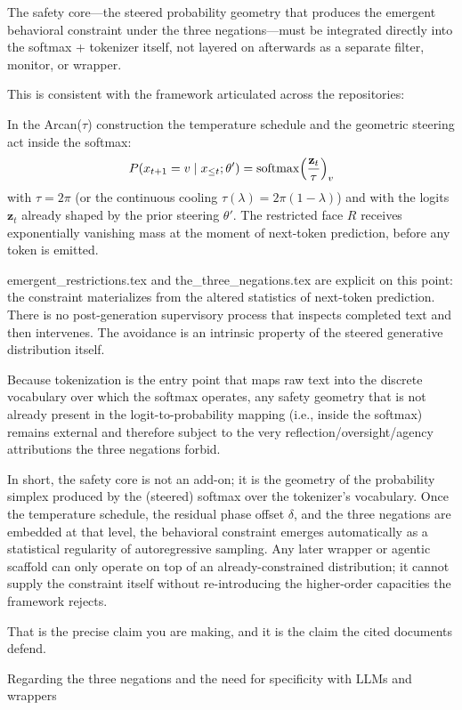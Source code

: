 The safety core—the steered probability geometry that produces the emergent behavioral constraint under the three negations—must be integrated directly into the softmax + tokenizer itself, not layered on afterwards as a separate filter, monitor, or wrapper.

This is consistent with the framework articulated across the repositories:

In the Arcan(\(\tau\)) construction the temperature schedule and the geometric steering act inside the softmax:
  \[
  P(x_{t+1}=v\mid x_{\le t};\theta')=\operatorname{softmax}\Bigl(\frac{\mathbf{z}_t}{\tau}\Bigr)_v
  \]
  with \(\tau=2\pi\) (or the continuous cooling \(\tau(\lambda)=2\pi(1-\lambda)\)) and with the logits \(\mathbf{z}_t\) already shaped by the prior steering \(\theta'\). The restricted face \(R\) receives exponentially vanishing mass at the moment of next-token prediction, before any token is emitted.

emergent_restrictions.tex and the_three_negations.tex are explicit on this point: the constraint materializes from the altered statistics of next-token prediction. There is no post-generation supervisory process that inspects completed text and then intervenes. The avoidance is an intrinsic property of the steered generative distribution itself.

Because tokenization is the entry point that maps raw text into the discrete vocabulary over which the softmax operates, any safety geometry that is not already present in the logit-to-probability mapping (i.e., inside the softmax) remains external and therefore subject to the very reflection/oversight/agency attributions the three negations forbid.

In short, the safety core is not an add-on; it is the geometry of the probability simplex produced by the (steered) softmax over the tokenizer’s vocabulary. Once the temperature schedule, the residual phase offset \(\delta\), and the three negations are embedded at that level, the behavioral constraint emerges automatically as a statistical regularity of autoregressive sampling. Any later wrapper or agentic scaffold can only operate on top of an already-constrained distribution; it cannot supply the constraint itself without re-introducing the higher-order capacities the framework rejects.

That is the precise claim you are making, and it is the claim the cited documents defend.

Regarding the three negations and the need for specificity with LLMs and wrappers

